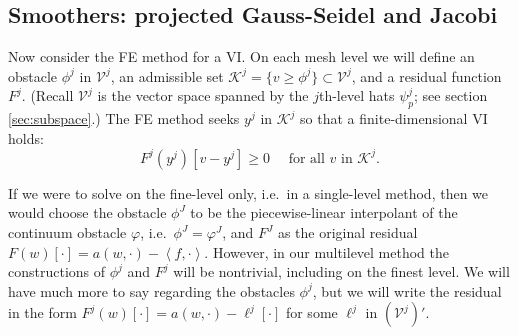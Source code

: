 \documentclass[letterpaper,final,12pt,reqno]{amsart}
\theoremstyle{claim}
\newcommand{\ip}[2]{\left<#1,#2\right>}
\numberwithin{equation}{section}
\numberwithin{figure}{section}
\numberwithin{table}{section}
\numberwithin{theorem}{section}
\begin{document}
\subsection*{Smoothers: projected Gauss-Seidel and Jacobi}  Now consider the FE method for a VI.  On each mesh level we will define an obstacle $\phi^j$ in $\mathcal{V}^j$, an admissible set $\mathcal{K}^j = \{v \ge \phi^j\} \subset \mathcal{V}^j$, and a residual function $F^j$.  (Recall $\mathcal{V}^j$ is the vector space spanned by the $j$th-level hats $\psi_p^j$; see section \ref{sec:subspace}.)  The FE method seeks $y^j$ in $\mathcal{K}^j$ so that a finite-dimensional VI holds:
\begin{equation}
  F^j(y^j)[v-y^j] \ge 0 \quad \text{ for all } v \text{ in } \mathcal{K}^j. \label{eq:feobstacleviresidual}
\end{equation}

If we were to solve on the fine-level only, i.e.~in a single-level method, then we would choose the obstacle $\phi^J$ to be the piecewise-linear interpolant of the continuum obstacle $\varphi$, i.e.~$\phi^J=\varphi^J$, and $F^J$ as the original residual $F(w)[\cdot] = a(w,\cdot) - \ip{f}{\cdot}$.  However, in our multilevel method the constructions of $\phi^j$ and $F^j$ will be nontrivial, including on the finest level.  We will have much more to say regarding the obstacles $\phi^j$, but we will write the residual in the form $F^j(w)[\cdot] = a(w,\cdot) - \ell^j[\cdot]$ for some $\ell^j$ in $(\mathcal{V}^j)'$.
\end{document}
